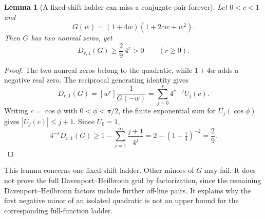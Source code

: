 \documentclass[11pt]{article}
\newtheorem{lemma}[theorem]{Lemma}
\theoremstyle{remark}
\begin{document}
\begin{lemma}[A fixed-shift ladder can miss a conjugate pair forever]\label{lem:mask}
Let \(0<c<1\) and
\begin{equation}\label{eq:mask}
 G(w)=(1+4w)(1+2cw+w^2).
\end{equation}
Then \(G\) has two nonreal zeros, yet
\begin{equation}\label{eq:maskbound}
 D_{r,1}(G)\ge \frac29\,4^r>0\qquad(r\ge0).
\end{equation}
\end{lemma}
\begin{proof}
The two nonreal zeros belong to the quadratic, while \(1+4w\) adds a
negative real zero. The reciprocal generating identity gives
\begin{equation}\label{eq:maskseries}
 D_{r,1}(G)=[w^r]\frac1{G(-w)}
       =\sum_{j=0}^r4^{r-j}U_j(c).
\end{equation}
Writing \(c=\cos\phi\) with \(0<\phi<\pi/2\), the finite exponential sum for
\(U_j(\cos\phi)\) gives \(|U_j(c)|\le j+1\).
Since \(U_0=1\),
\begin{equation}\label{eq:maskestimate}
 4^{-r}D_{r,1}(G)
 \ge1-\sum_{j=1}^{\infty}\frac{j+1}{4^j}
 =2-(1-\tfrac14)^{-2}=\frac29.
\end{equation}
\end{proof}
This lemma concerns one fixed-shift ladder. Other minors of \(G\) may fail.
It does not prove the full Davenport--Heilbronn grid by factorization, since
the remaining Davenport--Heilbronn factors include further off-line pairs.
It explains why the first negative minor of an isolated quadratic is not an
upper bound for the corresponding full-function ladder.
\end{document}
